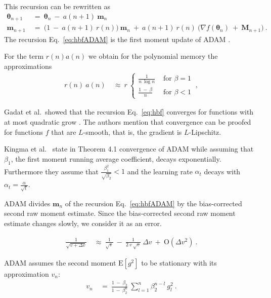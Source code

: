\documentclass{article}
\newcommand\Bm{\bm{m}}
\newcommand\BM{\bm{M}}
\newcommand\Bth{\bm{\theta}}
\newcommand{\rE}{\mathrm{E}} \newcommand{\rF}{\mathrm{F}}
\newcommand{\rO}{\mathrm{O}} \newcommand{\rP}{\mathrm{P}}
\begin{document}
This recursion can be rewritten as
\begin{align}
\label{eq:hbfADAM}
\Bth_{n+1} \ &= \ \Bth_n \ - \ a(n+1) \ \Bm_n \\
\Bm_{n+1} \ &= \ \big( 1 \ - \  a(n+1) \ r(n) \big) \ \Bm_n \ + \  a(n+1) \ r(n) \
\big( \nabla f(\Bth_n) \ + \ \BM_{n+1} \big) \ .
\end{align}
The recursion Eq.~\eqref{eq:hbfADAM} is the first moment update of ADAM \cite{Kingma:14}.

For the term $r(n) a(n)$ we obtain for the polynomial memory the approximations
\begin{align}
r(n) \ a(n) \ &\approx \
r \ \begin{cases}
\frac{1}{n \ \log n} & \mbox{ for } \beta=1 \\
\frac{1\ - \ \beta}{n} & \mbox{ for } \beta<1
\end{cases} \ ,
\end{align}



Gadat et al.\ showed that the recursion
Eq.~\eqref{eq:hbf} converges
for functions with at most quadratic grow \cite{Gadat:16}.
The authors mention that convergence can be proofed
for functions $f$ that are $L$-smooth, that is, the gradient is $L$-Lipschitz.


Kingma et al.\ \cite{Kingma:14} state in Theorem 4.1
convergence of ADAM while assuming that $\beta_1$, the
first moment running average coefficient, decays exponentially.
Furthermore they assume that $\frac{\beta_1^2}{\sqrt{\beta_2}}<1$
and the learning rate $\alpha_t$ decays with
$\alpha_t=\frac{\alpha}{\sqrt{t}}$.

ADAM divides $\Bm_n$ of the recursion Eq.~\eqref{eq:hbfADAM}
by the bias-corrected second raw moment estimate.
Since the bias-corrected second raw moment estimate changes slowly,
we consider it as an error.

\begin{align}
\frac{1}{\sqrt{v+\Delta v}} \ &\approx \
\frac{1}{\sqrt{v}} \ - \ \frac{1}{2 \ v \ \sqrt{v}} \ \Delta v
\ + \ \rO(\Delta v^2) \ .
\end{align}


ADAM assumes the second moment
$\rE \left[g^2\right]$ to be stationary with its  approximation
$v_n$:
\begin{align}
v_n \ &= \ \frac{1 \ - \ \beta_2}{1 \ - \ \beta_2^n} \ \sum_{l=1}^{n} \beta_2^{n-l} \ g_l^2 \ .
\end{align}
\end{document}

